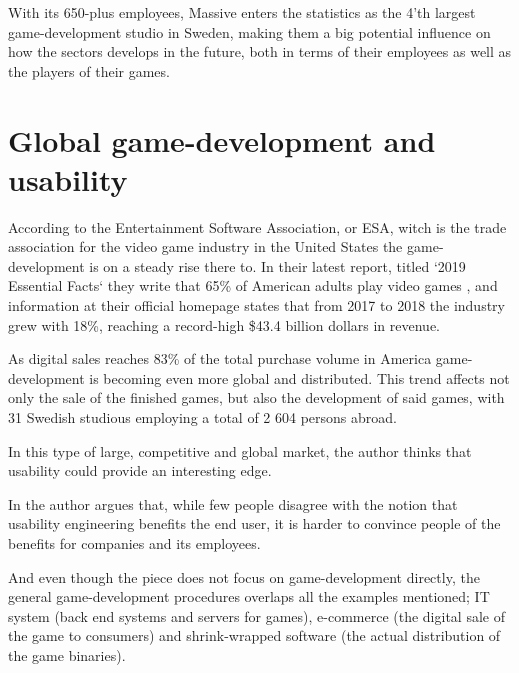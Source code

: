   With its 650-plus employees, Massive enters the statistics as the 4'th
  largest game-development studio in Sweden\cite[p. 21]{citeIndex2019},
  making them a big potential influence on how the sectors develops in the
  future, both in terms of their employees as well as the players of their
  games.


\section{Global game-development and usability}

  According to the Entertainment Software Association, or ESA, witch is the trade
  association for the video game industry in the United States the game-development
  is on a steady rise there to. In their latest report, titled `2019 Essential Facts`%
  \cite{cite2019EssentialFactsAbouttheComputerandVideoGameIndustryEntertainmentSoftwareAssociation}
  they write that 65\% of American adults play video
  games\cite[p. 4]{cite2019EssentialFactsAbouttheComputerandVideoGameIndustryEntertainmentSoftwareAssociation}
  , and information at their official homepage states that from 2017 to 2018
  the industry grew with 18\%, reaching a record-high \$43.4 billion dollars in
  revenue\cite{eseaEconomicGrowth}.

  As digital sales reaches 83\% of the total purchase volume in America%
  \cite[p. 20]{cite2019EssentialFactsAbouttheComputerandVideoGameIndustryEntertainmentSoftwareAssociation}
  game-development is becoming even more global and distributed. This trend affects
  not only the sale of the finished games, but also the development of said
  games, with 31 Swedish studious employing a total of 2 604 persons
  abroad\cite[p. 27]{citeIndex2019}.

  In this type of large, competitive and global market, the author thinks that
  usability could provide an interesting edge.

  In \cite{citeBottomLine} the author
  \citeauthor{citeBottomLine} argues that, while few people disagree with
  the notion that usability engineering benefits the end user, it is harder to
  convince people of the benefits for companies and its employees.

  And even though the piece does not focus on game-development directly, the
  general game-development procedures overlaps all the examples
  mentioned; IT system (back end systems and servers for games), e-commerce (the
  digital sale of the game to consumers) and shrink-wrapped software (the actual
  distribution of the game binaries).

